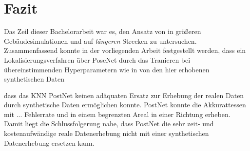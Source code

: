 
\section{Fazit}
\label{sec:kapitel_6}
Das Zeil dieser Bachelorarbeit war es, den Ansatz von \citet{acharyaBIMPoseNetIndoorCamera2019} in größeren Gebäudesimulationen und auf \textit{längeren} Strecken zu untersuchen.
Zusammenfassend konnte in der vorliegenden Arbeit festgestellt werden, dass ein Lokalisierungsverfahren über PoseNet durch das Tranieren bei übereinstimmenden Hyperparametern wie in \cite{acharyaBIMPoseNetIndoorCamera2019} von den hier erhobenen synthetischen Daten 


 dass das KNN PostNet keinen adäquaten Ersatz zur Erhebung der realen Daten durch synthetische Daten ermöglichen konnte. PostNet konnte die Akkurattessen mit ... Fehlerrate und in einem begrenzten Areal in einer Richtung erheben. Damit liegt die Schlussfolgerung nahe, dass PostNet die sehr zeit- und kostenaufwändige reale Datenerhebung nicht mit einer synthetischen Datenerhebung ersetzen kann.
